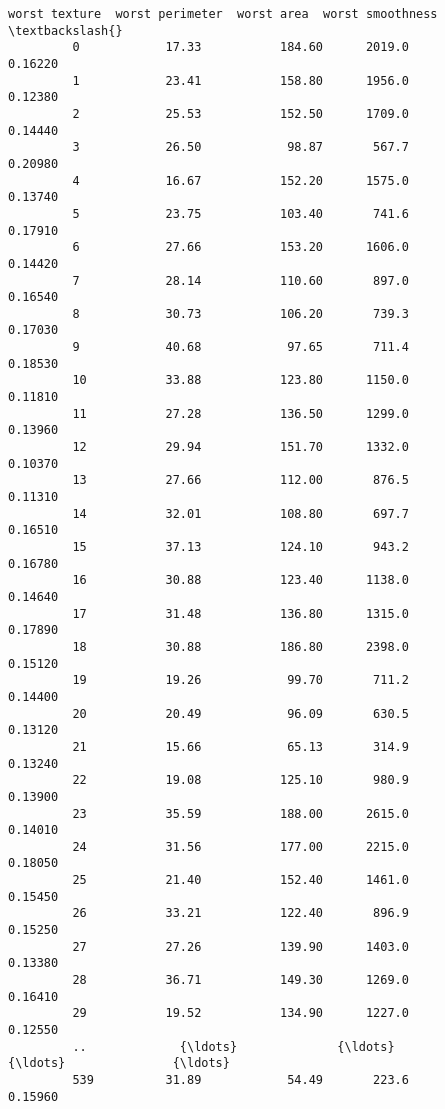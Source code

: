 \documentclass[11pt]{article}
\begin{document}
\begin{Verbatim}[commandchars=\\\{\}]
              worst texture  worst perimeter  worst area  worst smoothness  \textbackslash{}
         0            17.33           184.60      2019.0           0.16220   
         1            23.41           158.80      1956.0           0.12380   
         2            25.53           152.50      1709.0           0.14440   
         3            26.50            98.87       567.7           0.20980   
         4            16.67           152.20      1575.0           0.13740   
         5            23.75           103.40       741.6           0.17910   
         6            27.66           153.20      1606.0           0.14420   
         7            28.14           110.60       897.0           0.16540   
         8            30.73           106.20       739.3           0.17030   
         9            40.68            97.65       711.4           0.18530   
         10           33.88           123.80      1150.0           0.11810   
         11           27.28           136.50      1299.0           0.13960   
         12           29.94           151.70      1332.0           0.10370   
         13           27.66           112.00       876.5           0.11310   
         14           32.01           108.80       697.7           0.16510   
         15           37.13           124.10       943.2           0.16780   
         16           30.88           123.40      1138.0           0.14640   
         17           31.48           136.80      1315.0           0.17890   
         18           30.88           186.80      2398.0           0.15120   
         19           19.26            99.70       711.2           0.14400   
         20           20.49            96.09       630.5           0.13120   
         21           15.66            65.13       314.9           0.13240   
         22           19.08           125.10       980.9           0.13900   
         23           35.59           188.00      2615.0           0.14010   
         24           31.56           177.00      2215.0           0.18050   
         25           21.40           152.40      1461.0           0.15450   
         26           33.21           122.40       896.9           0.15250   
         27           27.26           139.90      1403.0           0.13380   
         28           36.71           149.30      1269.0           0.16410   
         29           19.52           134.90      1227.0           0.12550   
         ..             {\ldots}              {\ldots}         {\ldots}               {\ldots}   
         539          31.89            54.49       223.6           0.15960   

\end{Verbatim}
\end{document}
